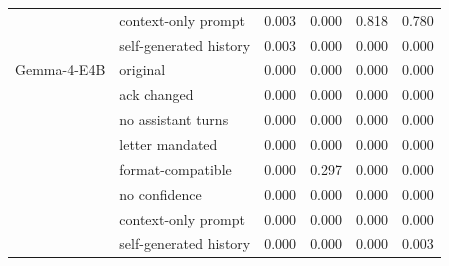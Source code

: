 \begin{tabular}{llrrrr}
 & context-only prompt & 0.003 & 0.000 & 0.818 & 0.780 \\
 & self-generated history & 0.003 & 0.000 & 0.000 & 0.000 \\
Gemma-4-E4B & original & 0.000 & 0.000 & 0.000 & 0.000 \\
 & ack changed & 0.000 & 0.000 & 0.000 & 0.000 \\
 & no assistant turns & 0.000 & 0.000 & 0.000 & 0.000 \\
 & letter mandated & 0.000 & 0.000 & 0.000 & 0.000 \\
 & format-compatible & 0.000 & 0.297 & 0.000 & 0.000 \\
 & no confidence & 0.000 & 0.000 & 0.000 & 0.000 \\
 & context-only prompt & 0.000 & 0.000 & 0.000 & 0.000 \\
 & self-generated history & 0.000 & 0.000 & 0.000 & 0.003 \\
\bottomrule
\end{tabular}
